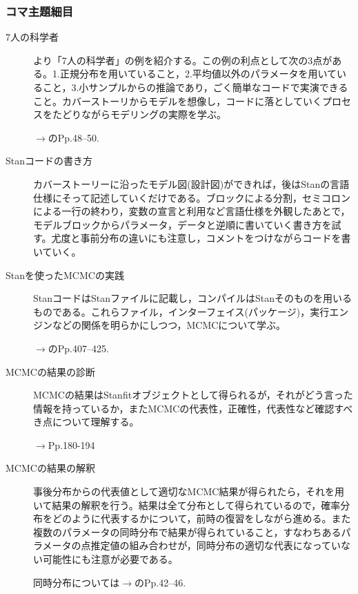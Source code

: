 \subsubsection{コマ主題細目}
\begin{description}
\item[7人の科学者] \citet{Lee201709}より「7人の科学者」の例を紹介する。この例の利点として次の3点がある。1.正規分布を用いていること，2.平均値以外のパラメータを用いていること，3.小サンプルからの推論であり，ごく簡単なコードで実演できること。カバーストーリからモデルを想像し，コードに落としていくプロセスをたどりながらモデリングの実際を学ぶ。
\begin{flushright}
    $\to$\citet{Lee201709}のPp.48--50.
\end{flushright}
\item[Stanコードの書き方] カバーストーリーに沿ったモデル図(設計図)ができれば，後はStanの言語仕様にそって記述していくだけである。ブロックによる分割，セミコロンによる一行の終わり，変数の宣言と利用など言語仕様を外観したあとで，モデルブロックからパラメータ，データと逆順に書いていく書き方を試す。尤度と事前分布の違いにも注意し，コメントをつけながらコードを書いていく。
 
\item[Stanを使ったMCMCの実践] StanコードはStanファイルに記載し，コンパイルはStanそのものを用いるものである。これらファイル，インターフェイス(パッケージ)，実行エンジンなどの関係を明らかにしつつ，MCMCについて学ぶ。

\begin{flushright}
    $\to$\citet{Maeda2017}のPp.407--425.
\end{flushright}


\item[MCMCの結果の診断] MCMCの結果はStanfitオブジェクトとして得られるが，それがどう言った情報を持っているか，またMCMCの代表性，正確性，代表性など確認すべき点について理解する。

\begin{flushright}
    $\to$\citet{Maeda2017}Pp.180-194
\end{flushright}

\item[MCMCの結果の解釈] 事後分布からの代表値として適切なMCMC結果が得られたら，それを用いて結果の解釈を行う。結果は全て分布として得られているので，確率分布をどのように代表するかについて，前時の復習をしながら進める。また複数のパラメータの同時分布で結果が得られていること，すなわちあるパラメータの点推定値の組み合わせが，同時分布の適切な代表になっていない可能性にも注意が必要である。

\begin{flushright}
    同時分布については$\to$\citet{Lee201709}のPp.42--46.
\end{flushright}
\end{description}
